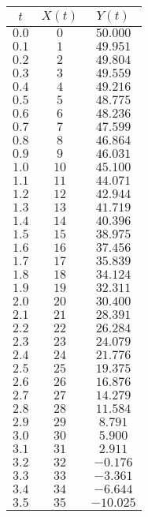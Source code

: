 \begin{tabular}{ccc} \toprule
$t$   & $X(t)$ & $Y(t)$   \\\midrule
$0.0$ & $0$    & $50.000$ \\
$0.1$ & $1$    & $49.951$ \\
$0.2$ & $2$    & $49.804$ \\
$0.3$ & $3$    & $49.559$ \\
$0.4$ & $4$    & $49.216$ \\
$0.5$ & $5$    & $48.775$ \\
$0.6$ & $6$    & $48.236$ \\
$0.7$ & $7$    & $47.599$ \\
$0.8$ & $8$    & $46.864$ \\
$0.9$ & $9$    & $46.031$ \\
$1.0$ & $10$   & $45.100$ \\
$1.1$ & $11$   & $44.071$ \\
$1.2$ & $12$   & $42.944$ \\
$1.3$ & $13$   & $41.719$ \\
$1.4$ & $14$   & $40.396$ \\
$1.5$ & $15$   & $38.975$ \\
$1.6$ & $16$   & $37.456$ \\
$1.7$ & $17$   & $35.839$ \\
$1.8$ & $18$   & $34.124$ \\
$1.9$ & $19$   & $32.311$ \\
$2.0$ & $20$   & $30.400$ \\
$2.1$ & $21$   & $28.391$ \\
$2.2$ & $22$   & $26.284$ \\
$2.3$ & $23$   & $24.079$ \\
$2.4$ & $24$   & $21.776$ \\
$2.5$ & $25$   & $19.375$ \\
$2.6$ & $26$   & $16.876$ \\
$2.7$ & $27$   & $14.279$ \\
$2.8$ & $28$   & $11.584$ \\
$2.9$ & $29$   & $8.791$  \\
$3.0$ & $30$   & $5.900$  \\
$3.1$ & $31$   & $2.911$  \\
$3.2$ & $32$   & $-0.176$ \\
$3.3$ & $33$   & $-3.361$ \\
$3.4$ & $34$   & $-6.644$ \\
$3.5$ & $35$   & $-10.025$ \\\bottomrule
\end{tabular}
